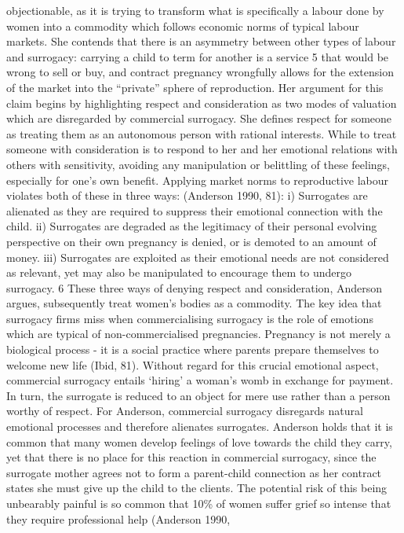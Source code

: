 objectionable, as it is trying to transform what is specifically a
labour done by women into a commodity which follows economic norms of
typical labour markets. She contends that there is an asymmetry between
other types of labour and surrogacy: carrying a child to term for
another is a service 5 that would be wrong to sell or buy, and contract
pregnancy wrongfully allows for the extension of the market into the
``private'' sphere of reproduction. Her argument for this claim begins
by highlighting respect and consideration as two modes of valuation
which are disregarded by commercial surrogacy. She defines respect for
someone as treating them as an autonomous person with rational
interests. While to treat someone with consideration is to respond to
her and her emotional relations with others with sensitivity, avoiding
any manipulation or belittling of these feelings, especially for one's
own benefit. Applying market norms to reproductive labour violates both
of these in three ways: (Anderson 1990, 81): i) Surrogates are alienated
as they are required to suppress their emotional connection with the
child. ii) Surrogates are degraded as the legitimacy of their personal
evolving perspective on their own pregnancy is denied, or is demoted to
an amount of money. iii) Surrogates are exploited as their emotional
needs are not considered as relevant, yet may also be manipulated to
encourage them to undergo surrogacy. 6 These three ways of denying
respect and consideration, Anderson argues, subsequently treat women's
bodies as a commodity. The key idea that surrogacy firms miss when
commercialising surrogacy is the role of emotions which are typical of
non-commercialised pregnancies. Pregnancy is not merely a biological
process - it is a social practice where parents prepare themselves to
welcome new life (Ibid, 81). Without regard for this crucial emotional
aspect, commercial surrogacy entails `hiring' a woman's womb in exchange
for payment. In turn, the surrogate is reduced to an object for mere use
rather than a person worthy of respect. For Anderson, commercial
surrogacy disregards natural emotional processes and therefore alienates
surrogates. Anderson holds that it is common that many women develop
feelings of love towards the child they carry, yet that there is no
place for this reaction in commercial surrogacy, since the surrogate
mother agrees not to form a parent-child connection as her contract
states she must give up the child to the clients. The potential risk of
this being unbearably painful is so common that 10\% of women suffer
grief so intense that they require professional help (Anderson 1990,
